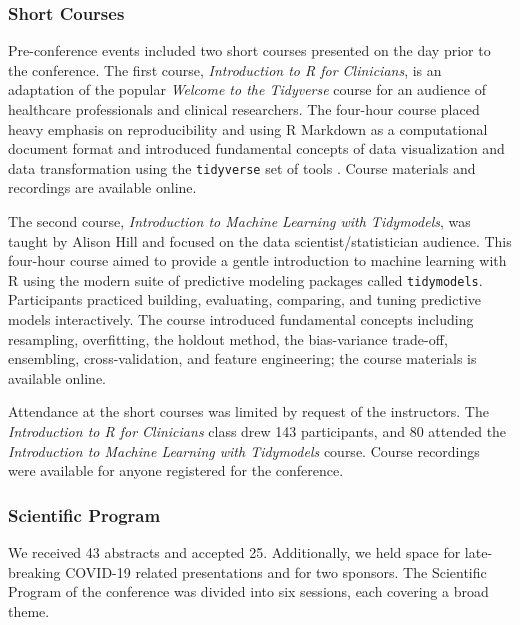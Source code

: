 \hypertarget{short-courses}{%
\subsubsection{Short Courses}\label{short-courses}}

Pre-conference events included two short courses presented on the day
prior to the conference. The first course, \emph{Introduction to R for
Clinicians}, is an adaptation of the popular \emph{Welcome to the
Tidyverse} course \citep{tidyclass} for an audience of healthcare
professionals and clinical researchers. The four-hour course placed
heavy emphasis on reproducibility and using R Markdown as a
computational document format and introduced fundamental concepts of
data visualization and data transformation using the \texttt{tidyverse}
set of tools \citep{Wickham2019}. Course materials \citep{introcourse}
and recordings \citep{introhear} are available online.

The second course, \emph{Introduction to Machine Learning with
Tidymodels}, was taught by Alison Hill and focused on the data
scientist/statistician audience. This four-hour course aimed to provide
a gentle introduction to machine learning with R using the modern suite
of predictive modeling packages called \texttt{tidymodels}. Participants
practiced building, evaluating, comparing, and tuning predictive models
interactively. The course introduced fundamental concepts including
resampling, overfitting, the holdout method, the bias-variance
trade-off, ensembling, cross-validation, and feature engineering; the
course materials \citep{tidycourse} is available online.

Attendance at the short courses was limited by request of the
instructors. The \emph{Introduction to R for Clinicians} class drew 143
participants, and 80 attended the \emph{Introduction to Machine Learning
with Tidymodels} course. Course recordings were available for anyone
registered for the conference.

\hypertarget{scientific-program}{%
\subsubsection{Scientific Program}\label{scientific-program}}

We received 43 abstracts and accepted 25. Additionally, we held space
for late-breaking COVID-19 related presentations and for two sponsors.
The Scientific Program of the conference was divided into six sessions,
each covering a broad theme.

